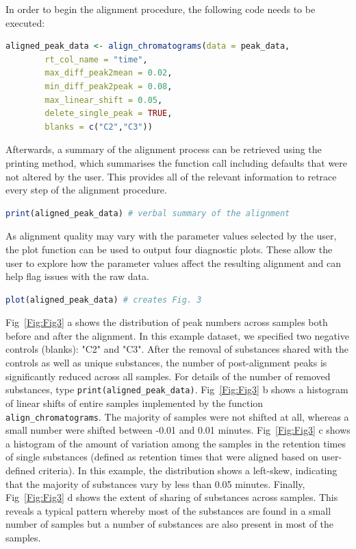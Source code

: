 \documentclass[10pt,letterpaper]{article}
\begin{document}
In order to begin the alignment procedure, the following code needs to be executed:

\begin{lstlisting}[language=R]
aligned_peak_data <- align_chromatograms(data = peak_data,
        rt_col_name = "time",
        max_diff_peak2mean = 0.02, 
        min_diff_peak2peak = 0.08, 
        max_linear_shift = 0.05, 
        delete_single_peak = TRUE, 
        blanks = c("C2","C3")) 
\end{lstlisting}

Afterwards, a summary of the alignment process can be retrieved using the printing method, which summarises the function call including defaults that were not altered by the user. This provides all of the relevant information to retrace every step of the alignment procedure.

\begin{lstlisting}[language=R]
print(aligned_peak_data) # verbal summary of the alignment
\end{lstlisting}

As alignment quality may vary with the parameter values selected by the user, the plot function can be used to output four diagnostic plots.  These allow the user to explore how the parameter values affect the resulting alignment and can help flag issues with the raw data.

\begin{lstlisting}[language=R]
plot(aligned_peak_data) # creates Fig. 3
\end{lstlisting}

Fig~\ref{Fig:Fig3} a shows the distribution of peak numbers across samples both before and after the alignment.  In this example dataset, we specified two negative controls (blanks): "C2" and "C3".  After the removal of substances shared with the controls as well as unique substances, the number of post-alignment peaks is significantly reduced across all samples.  For details of the number of removed substances, type \texttt{print(aligned\_peak\_data)}. Fig~\ref{Fig:Fig3} b shows a histogram of linear shifts of entire samples implemented by the function \texttt{align\_chromatograms}. The majority of samples were not shifted at all, whereas a small number were shifted between -0.01 and 0.01 minutes. Fig~\ref{Fig:Fig3} c shows a histogram of the amount of variation among the samples in the retention times of single substances (defined as retention times that were aligned based on user-defined criteria). In this example, the distribution shows a left-skew, indicating that the majority of substances vary by less than 0.05 minutes. Finally, Fig~\ref{Fig:Fig3} d shows the extent of sharing of substances across samples. This reveals a typical pattern whereby most of the substances are found in a small number of samples but a number of substances are also present in most of the samples. \par	
\end{document}
